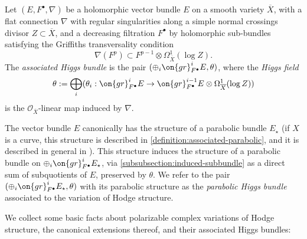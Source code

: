 \begin{definition}
\notready
\label{def:associated-higgs-bundle}
    Let $(E, F^\bullet, \nabla)$ be a holomorphic vector bundle $E$ on a smooth variety $\overline{X}$, with a flat connection $\nabla$ with regular singularities along a simple normal crossings divisor $Z\subset\overline{X}$, and a decreasing filtration $F^\bullet$ by holomorphic sub-bundles satisfying the Griffiths transversality condition \begin{equation}\label{eqn:griffiths-transversality-2} \nabla(F^p)\subset F^{p-1}\otimes \Omega^1_{\overline{X}}(\log Z).\end{equation} The \emph{associated Higgs bundle} is the pair $(\oplus_i \on{gr}^i_{F^\bullet}E, \theta)$, where the \emph{Higgs field} $$\theta:=\bigoplus_i (\theta_i: \on{gr}^i_{F^\bullet}E\to \on{gr}^{i-1}_{F^\bullet}E\otimes\Omega^1_{\overline{X}}(\log Z))$$ is the $\mathscr{O}_{\overline{X}}$-linear map induced by $\nabla.$

    The vector bundle $E$ canonically has the structure of a parabolic bundle
    $E_\star$
    (if $X$ is a curve, this structure is described in
    \autoref{definition:associated-parabolic}, and it is
    described in general in \cite[Proposition 5.4]{arapura2019vanishing}).
    This structure induces the structure of a parabolic bundle on $\oplus_i
    \on{gr}^i_{F^\bullet} E_\star$, via
    \autoref{subsubsection:induced-subbundle} as a direct sum of subquotients of $E$,
    preserved by $\theta$. We refer to the pair $(\oplus_i
    \on{gr}^i_{F^\bullet}E_\star, \theta)$ with its parabolic structure as the \emph{parabolic Higgs bundle} associated to the variation of Hodge structure.
\end{definition}
We collect some basic facts about polarizable complex variations of Hodge structure, the canonical extensions thereof, and their associated Higgs bundles:
